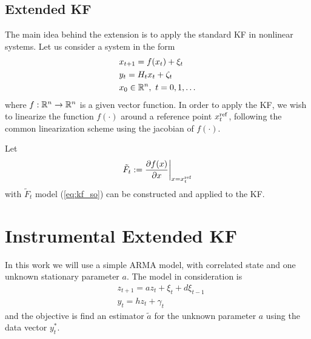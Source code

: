 \subsection{Extended KF}
The main idea behind the extension is to apply the standard KF in nonlinear systems. Let us consider a system in the form
\begin{equation}
  \begin{split}
    &x_{t+1}=f(x_t) + \xi_t\\
    &y_t=H_tx_t+\zeta_t\\
    &x_0\in{\mathbb{R}}^n, \ t=0,1,\dots
  \end{split}
\end{equation}
where $f:{\mathbb{R}}^n\rightarrow{\mathbb{R}}^n$ is a given vector function. In order to apply the KF, we wish to linearize the function $f(\cdot)$ around a reference point $x^{{\rm ref}}_t$, following the common linearization scheme using the jacobian of $f(\cdot)$.

Let
\[
\tilde{F}_t:=\dfrac{\partial f(x)}{\partial x}\bigg|_{x=x^{{\rm ref}}_t}
\]
with $\tilde{F}_t$ model (\ref{eq:kf_so}) can be constructed and applied to the KF.


\section{Instrumental Extended KF}\label{sec:IEKF}
In this work we will use a simple ARMA model, with correlated state and one unknown stationary parameter $a$. The model in consideration is
\begin{equation}
  \begin{split}
    &z_{t+1}=az_t+\xi_t+d\xi_{t-1}\\
    &y_{t}=hz_t+\gamma_{t}
  \end{split}
\end{equation}
and the objective is find an estimator $\tilde{a}$ for the unknown parameter $a$ using the data vector $y^*_t$.

